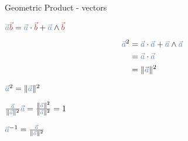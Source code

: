 \begin{frame}[t]{Geometric Product - vectors}

    \begin{center}

        {
            \Huge $\textcolor{blue}{\vec{a}} \textcolor{red}{\vec{b}} = \textcolor{blue}{\vec{a}} \cdot \textcolor{red}{\vec{b}} + \textcolor{blue}{\vec{a}} \wedge \textcolor{red}{\vec{b}}$
        }


        \Large

        {
            \vspace{1em}
            \begin{align*}
                \textcolor{blue}{\vec{a}}^2 & = \textcolor{blue}{\vec{a}} \cdot \textcolor{blue}{\vec{a}} + \textcolor{blue}{\vec{a}} \wedge \textcolor{blue}{\vec{a}} \\
                                            & = \textcolor{blue}{\vec{a}} \cdot \textcolor{blue}{\vec{a}}                                                              \\
                                            & = \| \textcolor{blue}{\vec{a}} \|^2
            \end{align*}
        }

        {
            $\textcolor{blue}{\vec{a}}^2 = \| \textcolor{blue}{\vec{a}} \|^2$

            \vspace{1em}
            $\frac{\textcolor{blue}{\vec{a}}}{\| \textcolor{blue}{\vec{a}} \|^2} \textcolor{blue}{\vec{a}} = \frac{\| \textcolor{blue}{\vec{a}} \|^2}{\| \textcolor{blue}{\vec{a}} \|^2} = 1$

            $\textcolor{blue}{\vec{a}}^{-1} = \frac{\textcolor{blue}{\vec{a}}}{\| \textcolor{blue}{\vec{a}} \|^2}$
        }
    \end{center}
\end{frame}



